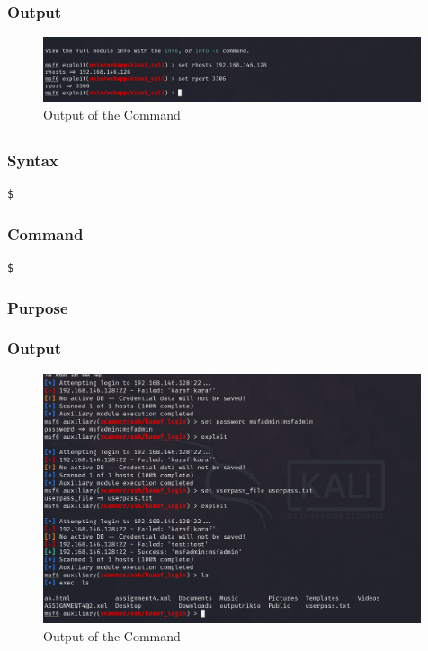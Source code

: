 \documentclass[11pt]{article}
\begin{document}
\subsubsection*{Output}
\begin{figure}[H]
    \centering
    \includegraphics[width=0.99\textwidth]{a3_ss (25).png}
    \caption{Output of the Command}
\end{figure}
\subsection{}

\subsubsection*{Syntax}
\begin{verbatim}
$
\end{verbatim}

\subsubsection*{Command}
\begin{verbatim}
$
\end{verbatim}

\subsubsection*{Purpose}

\subsubsection*{Output}
\begin{figure}[H]
    \centering
    \includegraphics[width=0.99\textwidth]{a3_ss (26).png}
    \caption{Output of the Command}
\end{figure}
\end{document}
